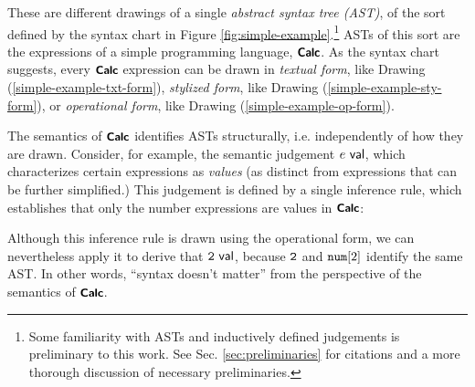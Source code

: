 \noindent
These are different drawings of a single \emph{abstract syntax tree (AST)}, of the sort defined by the syntax chart in Figure \ref{fig:simple-example}.\footnote{Some familiarity with ASTs and inductively defined judgements is preliminary to this work. See Sec. \ref{sec:preliminaries} for citations and a more thorough discussion of necessary preliminaries.} ASTs of this sort are the expressions of a simple programming language, $\simplelang$. 
As the syntax chart suggests, every $\simplelang$ expression can be drawn in \emph{textual form}, like Drawing (\ref{simple-example-txt-form}), \emph{stylized form}, like Drawing (\ref{simple-example-sty-form}), or \emph{operational form}, like Drawing (\ref{simple-example-op-form}).





 The semantics of $\simplelang$ identifies ASTs {structurally}, i.e. independently of how they are drawn. Consider, for example, the semantic judgement $\isvalU{e}$, which characterizes certain expressions as \emph{values} (as distinct from  expressions that can be further simplified.) This judgement is defined by a single inference rule, which establishes that only the number expressions are values in $\simplelang$:
\begin{mathpar}
\end{mathpar}
Although this inference rule is drawn using the operational form, we can nevertheless apply it to derive that $\isvalU{\numintro{2}}$, because $\numintro{2}$ and $\anumintro{2}$ identify the same AST. In other words, ``syntax doesn't matter'' from the perspective of the semantics of $\simplelang$.


